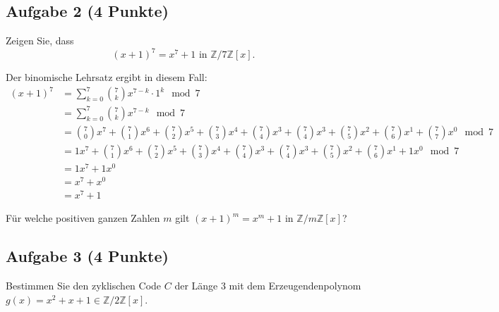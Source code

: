 \documentclass{article} %
\begin{document}
\subsection*{Aufgabe 2 (4 Punkte)}  
Zeigen Sie, dass  
\[ 
(x + 1)^7 = x^7 + 1 \text{ in } \mathbb{Z}/7\mathbb{Z}[x].
\]  
\begin{mybox}
Der binomische Lehrsatz ergibt in diesem Fall: 
\begin{align*}
    (x+1)^7 & = \sum_{k=0}^7 \binom{7}{k} x^{7-k} \cdot 1^k  \mod 7 \\
    & = \sum_{k=0}^7 \binom{7}{k} x^{7-k} \mod 7 \\
    & = \binom{7}{0} x^{7} + \binom{7}{1} x^{6} + \binom{7}{2} x^{5} + \binom{7}{3} x^{4} + \binom{7}{4} x^{3} + \binom{7}{4} x^{3} + \binom{7}{5} x^{2} + \binom{7}{6} x^{1} + \binom{7}{7} x^{0} \mod 7 \\
     & = 1 x^{7} + \binom{7}{1} x^{6} + \binom{7}{2} x^{5} + \binom{7}{3} x^{4} + \binom{7}{4} x^{3} + \binom{7}{4} x^{3} + \binom{7}{5} x^{2} + \binom{7}{6} x^{1} + 1 x^{0} \mod 7 \\ 
     & = 1 x^{7}  + 1 x^{0} \\ 
     & = x^{7}  +  x^{0} \\ 
     & = x^{7}  +  1 
\end{align*}

\end{mybox}
Für welche positiven ganzen Zahlen $m$ gilt $(x + 1)^m = x^m + 1$ in $\mathbb{Z}/m\mathbb{Z}[x]$?

\subsection*{Aufgabe 3 (4 Punkte)}  
Bestimmen Sie den zyklischen Code $C$ der Länge 3 mit dem Erzeugendenpolynom  
$g(x) = x^2 + x + 1 \in \mathbb{Z}/2\mathbb{Z}[x]$.
\end{document}
